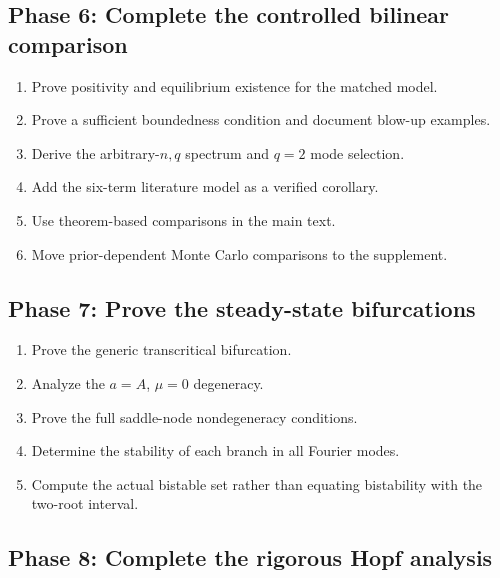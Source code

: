 \documentclass[11pt, reqno]{amsart}
\theoremstyle{definition}
\theoremstyle{remark}
\begin{document}
\subsection{Phase 6: Complete the controlled bilinear comparison}

\begin{enumerate}[label=6.\arabic*,leftmargin=3em]
    \item Prove positivity and equilibrium existence for the matched model.
    \item Prove a sufficient boundedness condition and document blow-up
    examples.
    \item Derive the arbitrary-$n,q$ spectrum and $q=2$ mode selection.
    \item Add the six-term literature model as a verified corollary.
    \item Use theorem-based comparisons in the main text.
    \item Move prior-dependent Monte Carlo comparisons to the supplement.
\end{enumerate}

\subsection{Phase 7: Prove the steady-state bifurcations}

\begin{enumerate}[label=7.\arabic*,leftmargin=3em]
    \item Prove the generic transcritical bifurcation.
    \item Analyze the $a=A$, $\mu=0$ degeneracy.
    \item Prove the full saddle-node nondegeneracy conditions.
    \item Determine the stability of each branch in all Fourier modes.
    \item Compute the actual bistable set rather than equating bistability with
    the two-root interval.
\end{enumerate}

\subsection{Phase 8: Complete the rigorous Hopf analysis}
\end{document}
